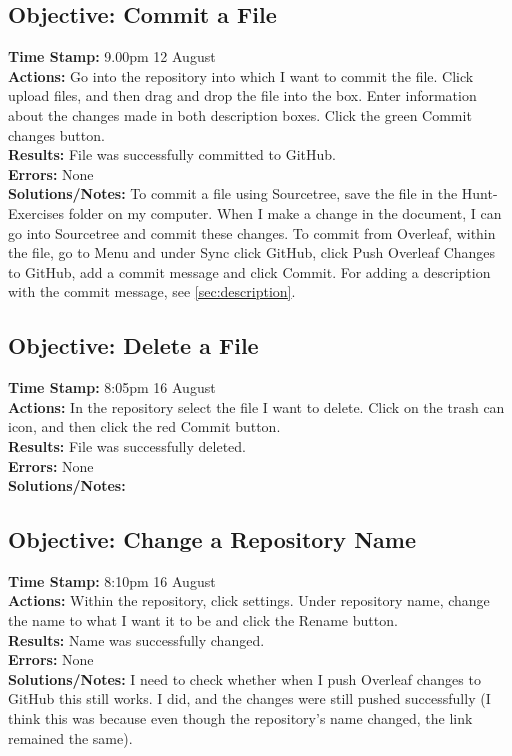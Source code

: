 \documentclass{article}
\begin{document}
\begin{FlushLeft}
\subsection{Objective: Commit a File}
\textbf{Time Stamp:} 9.00pm 12 August\\
\textbf{Actions:} Go into the repository into which I want to commit the file. Click upload files, and then drag and drop the file into the box. Enter information about the changes made in both description boxes. Click the green Commit changes button.\\
\textbf{Results:} File was successfully committed to GitHub.\\
\textbf{Errors:} None\\
\textbf{Solutions/Notes:} To commit a file using Sourcetree, save the file in the Hunt-Exercises folder on my computer. When I make a change in the document, I can go into Sourcetree and commit these changes. To commit from Overleaf, within the file, go to Menu and under Sync click GitHub, click Push Overleaf Changes to GitHub, add a commit message and click Commit. For adding a description with the commit message, see \autoref{sec:description}.

\subsection{Objective: Delete a File}
\textbf{Time Stamp:} 8:05pm 16 August\\
\textbf{Actions:} In the repository select the file I want to delete. Click on the trash can icon, and then click the red Commit button.\\
\textbf{Results:} File was successfully deleted.\\
\textbf{Errors:} None\\
\textbf{Solutions/Notes:}

\subsection{Objective: Change a Repository Name}
\textbf{Time Stamp:} 8:10pm 16 August\\
\textbf{Actions:} Within the repository, click settings. Under repository name, change the name to what I want it to be and click the Rename button.\\
\textbf{Results:} Name was successfully changed.\\
\textbf{Errors:} None\\
\textbf{Solutions/Notes:} I need to check whether when I push Overleaf changes to GitHub this still works. I did, and the changes were still pushed successfully (I think this was because even though the repository's name changed, the link remained the same).


\end{FlushLeft}
\end{document}
